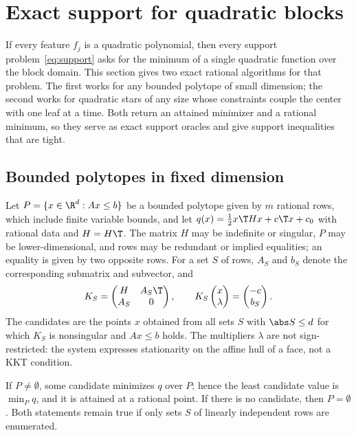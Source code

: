 \section{Exact support for quadratic blocks}\label{sec:quadratic}

If every feature $f_j$ is a quadratic polynomial, then every support
problem~\eqref{eq:support} asks for the minimum of a single quadratic
function over the block domain. This section gives two exact rational
algorithms for that problem. The first works for any bounded polytope of
small dimension; the second works for quadratic stars of any size whose
constraints couple the center with one leaf at a time. Both return an
attained minimizer and a rational minimum, so they serve as exact
support oracles and give support inequalities that are tight.

\subsection{Bounded polytopes in fixed dimension}\label{sec:polytope}

Let $P=\{x\in\R^d:Ax\le b\}$ be a bounded polytope given by $m$ rational
rows, which include finite variable bounds, and let
$q(x)=\tfrac12x\T Hx+c\T x+c_0$ with rational data and $H=H\T$. The
matrix $H$ may be indefinite or singular, $P$ may be lower-dimensional,
and rows may be redundant or implied equalities; an equality is given by
two opposite rows. For a set $S$ of rows, $A_S$ and $b_S$ denote the
corresponding submatrix and subvector, and
\begin{equation}\label{eq:kkt-system}
K_S=\begin{pmatrix}H&A_S\T\\ A_S&0\end{pmatrix},\qquad
K_S\begin{pmatrix}x\\ \lambda\end{pmatrix}=\begin{pmatrix}-c\\ b_S\end{pmatrix}.
\end{equation}
The candidates are the points $x$ obtained from all sets $S$ with
$\abs S\le d$ for which $K_S$ is nonsingular and $Ax\le b$ holds. The
multipliers $\lambda$ are not sign-restricted: the system expresses
stationarity on the affine hull of a face, not a KKT condition.

\begin{theorem}\label{thm:polytope}
If $P\ne\emptyset$, some candidate minimizes $q$ over $P$; hence the
least candidate value is $\min_Pq$, and it is attained at a rational
point. If there is no candidate, then $P=\emptyset$. Both statements
remain true if only sets $S$ of linearly independent rows are enumerated.
\end{theorem}

